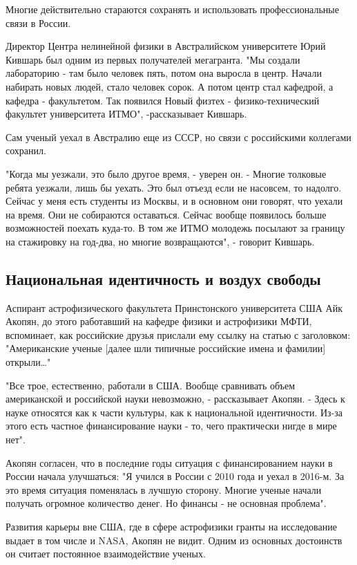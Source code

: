 Многие действительно стараются сохранять и использовать профессиональные связи в России.


Директор Центра нелинейной физики в Австралийском университете Юрий Кившарь был одним из первых получателей мегагранта. "Мы создали лабораторию - там было человек пять, потом она выросла в центр. Начали набирать новых людей, стало человек сорок. А потом центр стал кафедрой, а кафедра - факультетом. Так появился Новый физтех - физико-технический факультет университета ИТМО", -рассказывает Кившарь.

Сам ученый уехал в Австралию еще из СССР, но связи с российскими коллегами сохранил.

"Когда мы уезжали, это было другое время, - уверен он. - Многие толковые ребята уезжали, лишь бы уехать. Это был отъезд если не насовсем, то надолго. Сейчас у меня есть студенты из Москвы, и в основном они говорят, что уехали на время. Они не собираются оставаться. Сейчас вообще появилось больше возможностей поехать куда-то. В том же ИТМО молодежь посылают за границу на стажировку на год-два, но многие возвращаются", - говорит Кившарь.

\subsection{Национальная идентичность и воздух свободы}

Аспирант астрофизического факультета Принстонского университета США Айк Акопян, до этого работавший на кафедре физики и астрофизики МФТИ, вспоминает, как российские друзья прислали ему ссылку на статью с заголовком: "Американские ученые [далее шли типичные российские имена и фамилии] открыли…"

"Все трое, естественно, работали в США. Вообще сравнивать объем американской и российской науки невозможно, - рассказывает Акопян. - Здесь к науке относятся как к части культуры, как к национальной идентичности. Из-за этого есть частное финансирование науки - то, чего практически нигде в мире нет".

Акопян согласен, что в последние годы ситуация с финансированием науки в России начала улучшаться: "Я учился в России с 2010 года и уехал в 2016-м. За это время ситуация поменялась в лучшую сторону. Многие ученые начали получать огромное количество денег. Но финансы - не основная проблема".

Развития карьеры вне США, где в сфере астрофизики гранты на исследование выдает в том числе и NASA, Акопян не видит. Одним из основных достоинств он считает постоянное взаимодействие ученых.


